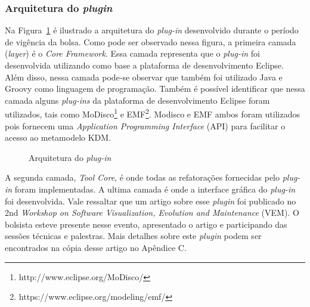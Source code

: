  \subsubsection{Arquitetura do \textit{plugin}}

Na Figura~\ref{fig:architecture} é ilustrado a arquitetura do \textit{plug-in} desenvolvido durante o período de vigência da bolsa. Como pode ser observado nessa figura, a primeira camada (\textit{layer}) é o \textit{Core Framework}. Essa camada representa que o \textit{plug-in} foi desenvolvida utilizando como base a plataforma de desenvolvimento Eclipse. Além disso, nessa camada pode-se observar que também foi utilizado Java e Groovy como linguagem de programação. Também é possível identificar que nessa camada alguns \textit{plug-ins} da plataforma de desenvolvimento Eclipse foram utilizados, tais como MoDisco\footnote{http://www.eclipse.org/MoDisco/} e EMF\footnote{https://www.eclipse.org/modeling/emf/}. Modisco e EMF ambos foram utilizados pois fornecem uma \textit{Application Programming Interface} (API) para facilitar o acesso ao metamodelo KDM.

\begin{figure}[!h]
 \centering
\caption{Arquitetura do \textit{plug-in}}
 \label{fig:architecture}
\end{figure}

A segunda camada, \textit{Tool Core}, é onde todas as refatorações fornecidas pelo \textit{plug-in} foram implementadas. A ultima camada é onde a interface gráfica do \textit{plug-in} foi desenvolvida. Vale ressaltar que um artigo sobre esse \textit{plugin} foi publicado no  2nd \textit{Workshop on Software Visualization, Evolution and Maintenance} (VEM). O bolsista esteve presente nesse evento, apresentado o artigo e participando das sessões técnicas e palestras. Mais detalhes sobre este \textit{plugin} podem ser encontrados na cópia desse artigo no Apêndice C.

